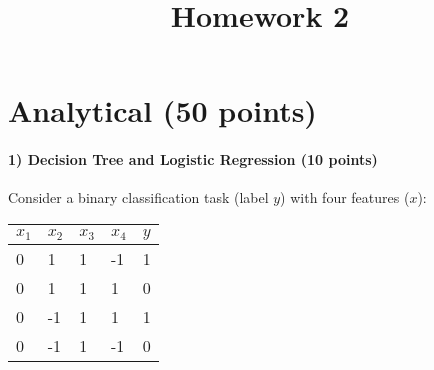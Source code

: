 \documentclass{article}
\begin{document}
\title{Homework 2}
\maketitle
\thispagestyle{fancy}

\section*{Analytical (50 points)}

\paragraph{1) Decision Tree and Logistic Regression (10 points)}
Consider a binary classification task (label $y$) with four features ($x$):

\begin{tabular}{ |l|l|l|l|l| }
	\hline
	$x_1$ & $x_2$ & $x_3$ & $x_4$ & $y$ \\
	\hline
	0& 1 & 1& -1 & 1 \\
	0&  1 & 1& 1 & 0 \\
	0&  -1 & 1& 1 & 1 \\
	0&  -1 & 1& -1 & 0 \\
	\hline
\end{tabular}
\end{document}
